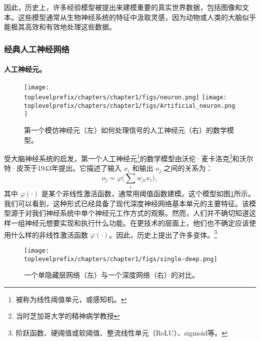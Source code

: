 \documentclass[../../book-main.tex]{subfiles}
\begin{document}
因此，历史上，许多经验模型被提出来建模重要的真实世界数据，包括图像和文本。这些模型通常从生物神经系统的特征中汲取灵感，因为动物或人类的大脑似乎能极其高效和有效地处理这些数据。

\subsubsection{经典人工神经网络}
\paragraph{人工神经元。}

\begin{figure}[t]
    \centering
\texttt{[image: \\toplevelprefix/chapters/chapter1/figs/neuron.png]} \hspace{3mm}   
\texttt{[image: \\toplevelprefix/chapters/chapter1/figs/Artificial\_neuron.png]}
    \caption{第一个模仿神经元（左）如何处理信号的人工神经元（右）的数学模型。}
    \label{fig:neuron}
\end{figure}

受大脑神经系统的启发，第一个人工神经元\footnote{被称为线性阈值单元，或感知机。}的数学模型由沃伦·麦卡洛克\footnote{当时芝加哥大学的精神病学教授}和沃尔特·皮茨于1943年提出\cite{McCulloch-Pitts}。它描述了输入 $x_i$ 和输出 $o_j$ 之间的关系为：
\begin{equation}
    o_j = \varphi\Big( \sum_i w_{ji}x_i\Big),  
\end{equation}
其中 $\varphi(\cdot)$ 是某个非线性激活函数，通常用阈值函数建模。这个模型如图\ref{fig:neuron}所示。我们可以看到，这种形式已经具备了现代深度神经网络基本单元的主要特征。该模型源于对我们神经系统中单个神经元工作方式的观察。然而，人们并不确切知道这样一组神经元想要实现和执行什么功能。在更技术的层面上，他们也不确定应该使用什么样的非线性激活函数 $\varphi(\cdot)$。因此，历史上提出了许多变体。\footnote{阶跃函数、硬阈值或软阈值、整流线性单元（ReLU）、sigmoid等。
}

\begin{figure}[t]
\centering
\texttt{[image: \\toplevelprefix/chapters/chapter1/figs/single-deep.png]}
    \caption{一个单隐藏层网络（左）与一个深度网络（右）的对比。}
    \label{fig:single-deep}
\end{figure}
\end{document}
